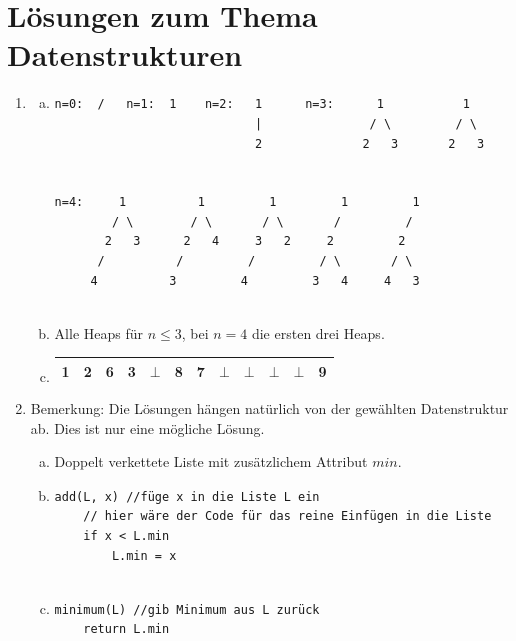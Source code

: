 \documentclass{scrartcl}
\begin{document}
\TabPositions{0.8cm, 1.6cm, 2.4cm, 3.2cm}

\section*{Lösungen zum Thema Datenstrukturen}
\begin{enumerate}[(1)]

\item \begin{enumerate}[(a)]
\item
\begin{verbatim}
n=0:  /   n=1:  1    n=2:   1      n=3:      1           1
                            |               / \         / \
                            2              2   3       2   3
                            

n=4:     1          1         1         1         1
        / \        / \       / \       /         /  
       2   3      2   4     3   2     2         2
      /          /         /         / \       / \
     4          3         4         3   4     4   3
     
\end{verbatim}
\item Alle Heaps f\"ur $n\leq 3$, bei $n=4$ die ersten drei Heaps.
\item \begin{tabular}{|c|c|c|c|c|c|c|c|c|c|c|c|}
\hline
1 & 2 & 6 & 3 & $\bot$ & 8 & 7 & $\bot$ & $\bot$ & $\bot$ & $\bot$ & 9 \\ \hline
\end{tabular}
\end{enumerate}

\item 
Bemerkung: Die L\"osungen h\"angen nat\"urlich von der gew\"ahlten Datenstruktur ab. Dies ist nur eine m\"ogliche L\"osung.
\begin{enumerate}[(a)]
\item Doppelt verkettete Liste mit zus\"atzlichem Attribut $min$.
\item
\begin{verbatim}
add(L, x) //füge x in die Liste L ein
    // hier wäre der Code für das reine Einfügen in die Liste
    if x < L.min
    	L.min = x
    	
\end{verbatim}
\item
\begin{verbatim}
minimum(L) //gib Minimum aus L zurück
    return L.min
    	

\end{verbatim}
\end{enumerate}
\end{enumerate}
\end{document}
